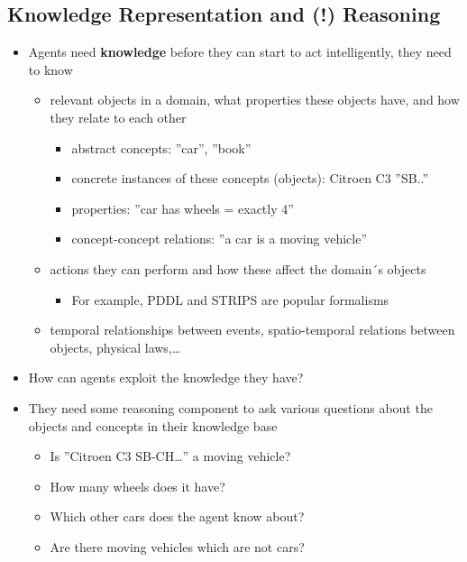 \documentclass[conference]{styles/acmsiggraph}
\begin{document}
    \subsection{Knowledge Representation and (!) Reasoning}
        \begin{itemize}
            \item Agents need \textbf{knowledge} before they can start to act intelligently, they need to know
                \begin{itemize}
                    \item relevant objects in a domain, what properties these objects have, and how they relate to each other
                        \begin{itemize}
                            \item abstract concepts: ''car'', ''book''
                            \item concrete instances of these concepts (objects): Citroen C3 ''SB..''
                            \item properties: ''car has wheels = exactly 4''
                            \item concept-concept relations: ''a car is a moving vehicle''
                        \end{itemize}
                    \item actions they can perform and how these affect the domain´s objects
                        \begin{itemize}
                            \item For example, PDDL and STRIPS are popular formalisms
                        \end{itemize}
                    \item temporal relationships between events, spatio-temporal relations between objects, physical laws,…
                \end{itemize}
            \item How can agents exploit the knowledge they have?
            \item They need some reasoning component to ask various questions about the objects and concepts in their knowledge base
                \begin{itemize}
                    \item Is ''Citroen C3 SB-CH…'' a moving vehicle?
                    \item How many wheels does it have?
                    \item Which other cars does the agent know about?
                    \item Are there moving vehicles which are not cars?
                \end{itemize}
        \end{itemize}
    
\end{document}
